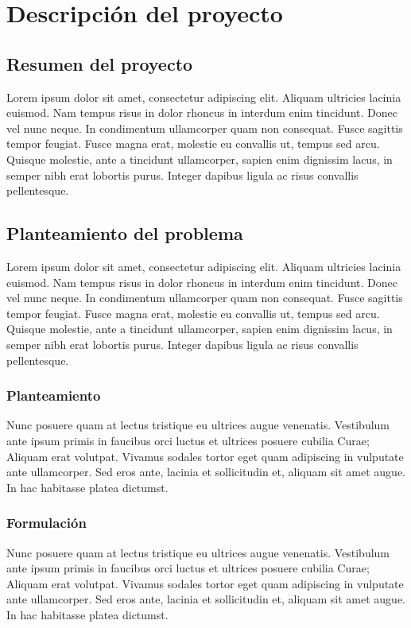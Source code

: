 
\chapter{Descripción del proyecto} %

\label{Chapter1} %


\section{Resumen del proyecto}
Lorem ipsum dolor sit amet, consectetur adipiscing elit. Aliquam ultricies lacinia euismod. Nam tempus risus in dolor rhoncus in interdum enim tincidunt. Donec vel nunc neque. In condimentum ullamcorper quam non consequat. Fusce sagittis tempor feugiat. Fusce magna erat, molestie eu convallis ut, tempus sed arcu. Quisque molestie, ante a tincidunt ullamcorper, sapien enim dignissim lacus, in semper nibh erat lobortis purus. Integer dapibus ligula ac risus convallis pellentesque.
\section{Planteamiento del problema}
Lorem ipsum dolor sit amet, consectetur adipiscing elit. Aliquam ultricies lacinia euismod. Nam tempus risus in dolor rhoncus in interdum enim tincidunt. Donec vel nunc neque. In condimentum ullamcorper quam non consequat. Fusce sagittis tempor feugiat. Fusce magna erat, molestie eu convallis ut, tempus sed arcu. Quisque molestie, ante a tincidunt ullamcorper, sapien enim dignissim lacus, in semper nibh erat lobortis purus. Integer dapibus ligula ac risus convallis pellentesque.
\subsection{Planteamiento}
Nunc posuere quam at lectus tristique eu ultrices augue venenatis. Vestibulum ante ipsum primis in faucibus orci luctus et ultrices posuere cubilia Curae; Aliquam erat volutpat. Vivamus sodales tortor eget quam adipiscing in vulputate ante ullamcorper. Sed eros ante, lacinia et sollicitudin et, aliquam sit amet augue. In hac habitasse platea dictumst.
\subsection{Formulación}
Nunc posuere quam at lectus tristique eu ultrices augue venenatis. Vestibulum ante ipsum primis in faucibus orci luctus et ultrices posuere cubilia Curae; Aliquam erat volutpat. Vivamus sodales tortor eget quam adipiscing in vulputate ante ullamcorper. Sed eros ante, lacinia et sollicitudin et, aliquam sit amet augue. In hac habitasse platea dictumst.

